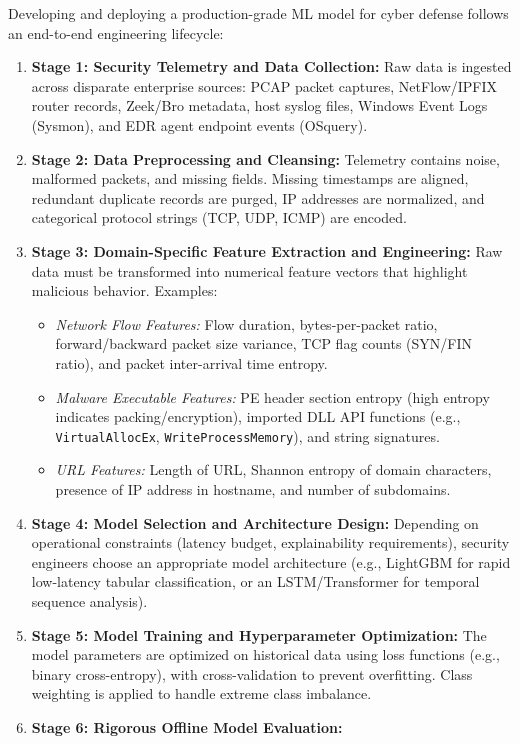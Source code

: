 Developing and deploying a production-grade ML model for cyber defense follows an end-to-end engineering lifecycle:

\begin{enumerate}
\item \textbf{Stage 1: Security Telemetry and Data Collection:}
Raw data is ingested across disparate enterprise sources: PCAP packet captures, NetFlow/IPFIX router records, Zeek/Bro metadata, host syslog files, Windows Event Logs (Sysmon), and EDR agent endpoint events (OSquery).
\item \textbf{Stage 2: Data Preprocessing and Cleansing:}
Telemetry contains noise, malformed packets, and missing fields. Missing timestamps are aligned, redundant duplicate records are purged, IP addresses are normalized, and categorical protocol strings (TCP, UDP, ICMP) are encoded.
\item \textbf{Stage 3: Domain-Specific Feature Extraction and Engineering:}
Raw data must be transformed into numerical feature vectors that highlight malicious behavior. Examples:
\begin{itemize}
\item \textit{Network Flow Features:} Flow duration, bytes-per-packet ratio, forward/backward packet size variance, TCP flag counts (SYN/FIN ratio), and packet inter-arrival time entropy.
\item \textit{Malware Executable Features:} PE header section entropy (high entropy indicates packing/encryption), imported DLL API functions (e.g., \texttt{VirtualAllocEx}, \texttt{WriteProcessMemory}), and string signatures.
\item \textit{URL Features:} Length of URL, Shannon entropy of domain characters, presence of IP address in hostname, and number of subdomains.
\end{itemize}
\item \textbf{Stage 4: Model Selection and Architecture Design:}
Depending on operational constraints (latency budget, explainability requirements), security engineers choose an appropriate model architecture (e.g., LightGBM for rapid low-latency tabular classification, or an LSTM/Transformer for temporal sequence analysis).
\item \textbf{Stage 5: Model Training and Hyperparameter Optimization:}
The model parameters are optimized on historical data using loss functions (e.g., binary cross-entropy), with cross-validation to prevent overfitting. Class weighting is applied to handle extreme class imbalance.
\item \textbf{Stage 6: Rigorous Offline Model Evaluation:}

\end{enumerate}
